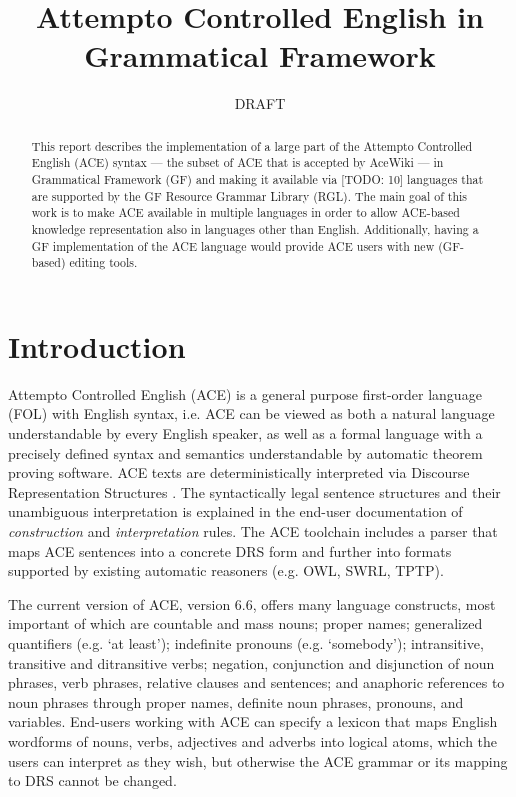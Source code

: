 \documentclass[a4paper]{article}
\newcommand\ace{Attempto Controlled English}
\begin{document}
\title{Attempto Controlled English in Grammatical Framework}
\author{DRAFT}


\maketitle
\begin{abstract}
This report describes the implementation of a large part of the
Attempto Controlled English (ACE) syntax ---
the subset of ACE that is accepted by AceWiki ---
in Grammatical Framework (GF) and making it available via [TODO: 10]
languages that are supported by the GF Resource Grammar Library (RGL).
The main goal of this work is to make ACE available in multiple languages
in order to allow
ACE-based knowledge representation also in languages other than English.
Additionally, having a GF implementation of the ACE language would provide
ACE users with new (GF-based) editing tools.
\end{abstract}

\section{Introduction}

\ace{} (ACE) \cite{fuchs:reasoningweb2008}
is a general purpose
first-order language (FOL)
with English syntax,
i.e. ACE can be viewed as both a natural language understandable by every
English speaker, as well as a formal language with a precisely defined
syntax and semantics understandable by automatic theorem proving software.
ACE texts are deterministically interpreted
via Discourse Representation Structures \cite{kamp:drt1993}.
The syntactically legal sentence structures and their
unambiguous interpretation is explained in the end-user documentation of
\emph{construction} and \emph{interpretation} rules.
The ACE toolchain includes a parser that maps ACE sentences into a concrete
DRS form \cite{ifi-2010.0010} and further into formats supported by existing
automatic reasoners (e.g. OWL, SWRL, TPTP).

The current version of ACE, version 6.6, offers many language constructs, most
important of which are
countable and mass nouns;
proper names;
generalized quantifiers (e.g. `at least');
indefinite pronouns (e.g. `somebody');
intransitive, transitive and ditransitive verbs;
negation, conjunction and disjunction of
noun phrases, verb phrases, relative clauses and sentences;
and anaphoric references to noun phrases through proper names,
definite noun phrases, pronouns, and variables.
End-users working with ACE can specify a lexicon that maps English
wordforms of nouns, verbs, adjectives and adverbs into logical atoms,
which the users
can interpret as they wish, but otherwise the ACE grammar or its mapping to
DRS cannot be changed.
\end{document}
